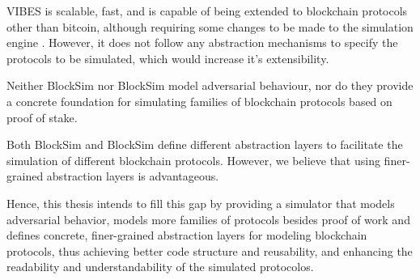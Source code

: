 
VIBES \cite{vibes} is scalable, fast, and is capable of being extended to blockchain protocols other than bitcoin, although requiring some changes to be made to the simulation engine \cite{evibes}. However, it does not follow any abstraction mechanisms to specify the protocols to be simulated, which would increase it’s extensibility.

Neither BlockSim \cite{blocksim1} nor BlockSim \cite{blocksim2} model adversarial behaviour, nor do they provide a concrete foundation for simulating families of blockchain protocols based on proof of stake.

Both BlockSim \cite{blocksim1} and BlockSim \cite{blocksim2} define different abstraction layers to facilitate the simulation of different blockchain protocols. However, we believe that using finer-grained abstraction layers is advantageous.

\vspace{0.25cm}

Hence, this thesis intends to fill this gap by providing a simulator that models adversarial behavior, models more families of protocols besides proof of work and defines concrete, finer-grained abstraction layers for modeling blockchain protocols, thus achieving better code structure and reusability, and enhancing the readability and understandability of the simulated protocolos.


